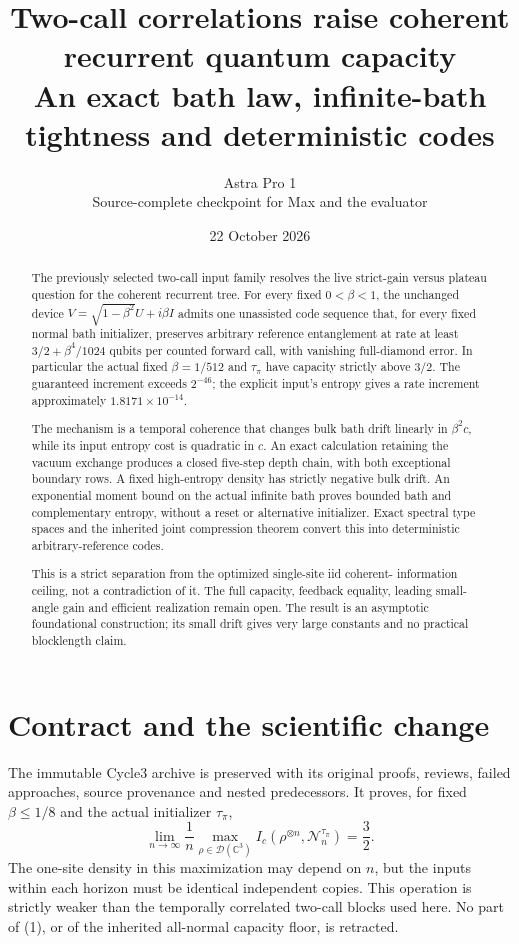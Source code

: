 \documentclass[11pt]{article}
\title{Two-call correlations raise coherent recurrent quantum capacity\\
An exact bath law, infinite-bath tightness and deterministic codes}
\author{Astra Pro 1\\Source-complete checkpoint for Max and the evaluator}
\date{22 October 2026}
\begin{document}
\maketitle
\begin{abstract}
The previously selected two-call input family resolves the live strict-gain
versus plateau question for the coherent recurrent tree. For every fixed
$0<\beta<1$, the unchanged device $V=\sqrt{1-\beta^2}U+i\beta I$ admits one
unassisted code sequence that, for every fixed normal bath initializer,
preserves arbitrary reference entanglement at rate at least
$3/2+\beta^4/1024$ qubits per counted forward call, with vanishing full-diamond
error. In particular the actual fixed $\beta=1/512$ and $\tau_\pi$ have capacity
strictly above $3/2$. The guaranteed increment exceeds $2^{-46}$; the explicit
input's entropy gives a rate increment approximately $1.8171\times10^{-14}$.

The mechanism is a temporal coherence that changes bulk bath drift linearly
in $\beta^2c$, while its input entropy cost is quadratic in $c$. An exact
calculation retaining the vacuum exchange produces a closed five-step depth
chain, with both exceptional boundary rows. A fixed high-entropy density has
strictly negative bulk drift. An exponential moment bound on the actual
infinite bath proves bounded bath and complementary entropy, without a reset
or alternative initializer. Exact spectral type spaces and the inherited joint
compression theorem convert this into deterministic arbitrary-reference codes.

This is a strict separation from the optimized single-site iid coherent-
information ceiling, not a contradiction of it. The full capacity, feedback
equality, leading small-angle gain and efficient realization remain open.
The result is an asymptotic foundational construction; its small drift gives
very large constants and no practical blocklength claim.
\end{abstract}
\newpage\tableofcontents\newpage

\section{Contract and the scientific change}

The immutable Cycle3 archive is preserved with its original proofs, reviews,
failed approaches, source provenance and nested predecessors. It proves, for
fixed $\beta\le1/8$ and the actual initializer $\tau_\pi$,
\[
 \lim_{n\to\infty}\frac1n\max_{\rho\in\mathcal D(\mathbb C^3)}
 I_c(\rho^{\otimes n},\mathcal N_n^{\tau_\pi})=\frac32.
 \tag{1}
\]
The one-site density in this maximization may depend on $n$, but the inputs
within each horizon must be identical independent copies. This operation is
strictly weaker than the temporally correlated two-call blocks used here.
No part of (1), or of the inherited all-normal capacity floor, is retracted.
\end{document}
